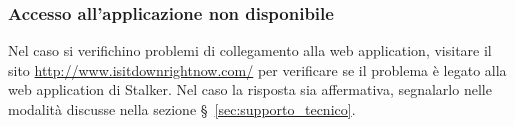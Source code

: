 \documentclass[../manuale-utente.tex]{subfiles}
\begin{document}
\subsubsection{Accesso all'applicazione non disponibile}%
\label{subs:web_app_accesso_non_disponibile}

Nel caso si verifichino problemi di collegamento alla web application, visitare il sito \href{http://www.isitdownrightnow.com/}{http://www.isitdownrightnow.com/} per verificare se il problema è legato alla web application di Stalker.
Nel caso la risposta sia affermativa, segnalarlo nelle modalità discusse nella sezione §~\ref{sec:supporto_tecnico}.
\end{document}
